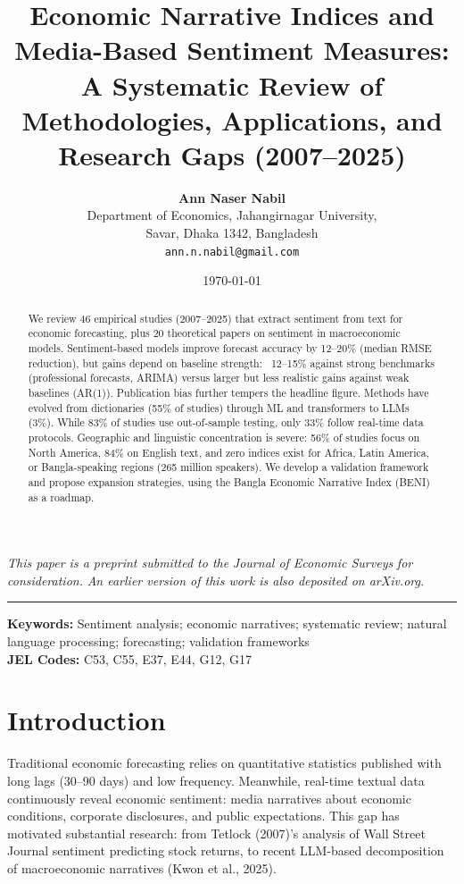 \documentclass[11pt,twocolumn]{article}
\title{\textbf{Economic Narrative Indices and Media-Based Sentiment Measures:\\
A Systematic Review of Methodologies, Applications, and Research Gaps (2007--2025)}}
\author{\textbf{Ann Naser Nabil}\orcidlink{0009-0006-3561-045X}\\[4pt]
  \small Department of Economics, Jahangirnagar University,\\
  \small Savar, Dhaka 1342, Bangladesh\\
  \small\texttt{ann.n.nabil@gmail.com}}
\date{\today}
\begin{document}
\maketitle

\noindent\small\textit{This paper is a preprint submitted to the}
\textit{Journal of Economic Surveys}
\textit{for consideration.}
\textit{An earlier version of this work is also deposited on arXiv.org.}
\par\vspace{0.5em}

\hrule\vspace{1em}

\begin{abstract}
We review 46 empirical studies (2007--2025) that extract sentiment from text for economic forecasting, plus 20 theoretical papers on sentiment in macroeconomic models. Sentiment-based models improve forecast accuracy by 12--20\% (median RMSE reduction), but gains depend on baseline strength: ~12--15\% against strong benchmarks (professional forecasts, ARIMA) versus larger but less realistic gains against weak baselines (AR(1)). Publication bias further tempers the headline figure. Methods have evolved from dictionaries (55\% of studies) through ML and transformers to LLMs (3\%). While 83\% of studies use out-of-sample testing, only 33\% follow real-time data protocols. Geographic and linguistic concentration is severe: 56\% of studies focus on North America, 84\% on English text, and zero indices exist for Africa, Latin America, or Bangla-speaking regions (265 million speakers). We develop a validation framework and propose expansion strategies, using the Bangla Economic Narrative Index (BENI) as a roadmap.
\end{abstract}

\noindent \textbf{Keywords:} Sentiment analysis; economic narratives; systematic review; natural language processing; forecasting; validation frameworks \\
\textbf{JEL Codes:} C53, C55, E37, E44, G12, G17

\section{Introduction}

Traditional economic forecasting relies on quantitative statistics published with long lags (30--90 days) and low frequency. Meanwhile, real-time textual data continuously reveal economic sentiment: media narratives about economic conditions, corporate disclosures, and public expectations. This gap has motivated substantial research: from Tetlock (2007)'s analysis of Wall Street Journal sentiment predicting stock returns, to recent LLM-based decomposition of macroeconomic narratives (Kwon et al., 2025).
\end{document}

